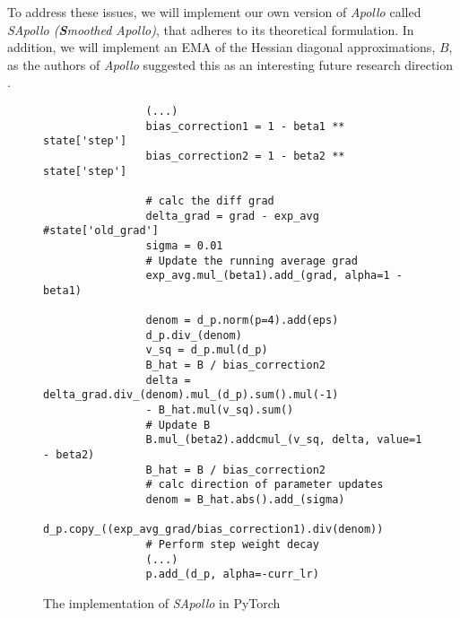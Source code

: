     To address these issues, we will implement our own version of \emph{Apollo} called  \emph{SApollo (\textbf{S}moothed Apollo)}, that adheres to its theoretical formulation.
    In addition, we will implement an EMA of the Hessian diagonal approximations, $B$, as the authors of \emph{Apollo} suggested this as an interesting future research direction \cite{apollo}.
    \begin{figure}[H]
        \begin{verbatim}
                (...)
                bias_correction1 = 1 - beta1 ** state['step']
                bias_correction2 = 1 - beta2 ** state['step']

                # calc the diff grad
                delta_grad = grad - exp_avg #state['old_grad']
                sigma = 0.01
                # Update the running average grad
                exp_avg.mul_(beta1).add_(grad, alpha=1 - beta1)

                denom = d_p.norm(p=4).add(eps)
                d_p.div_(denom)
                v_sq = d_p.mul(d_p)
                B_hat = B / bias_correction2
                delta = delta_grad.div_(denom).mul_(d_p).sum().mul(-1) 
                - B_hat.mul(v_sq).sum()
                # Update B
                B.mul_(beta2).addcmul_(v_sq, delta, value=1 - beta2)
                B_hat = B / bias_correction2
                # calc direction of parameter updates
                denom = B_hat.abs().add_(sigma)
                d_p.copy_((exp_avg_grad/bias_correction1).div(denom))
                # Perform step weight decay
                (...)
                p.add_(d_p, alpha=-curr_lr)
        \end{verbatim}
        \caption{The implementation of \emph{SApollo} in PyTorch}
        \label{fig:sapollo_imp}
    
        \end{figure}


